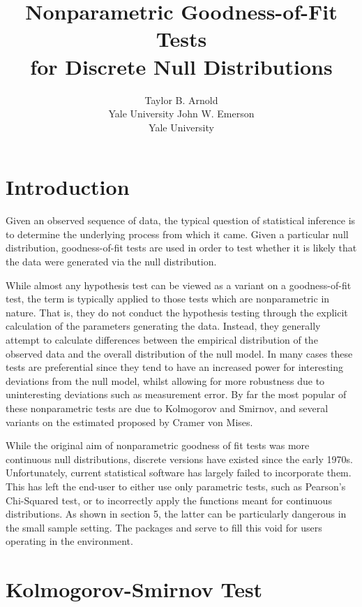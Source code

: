 \documentclass[article]{jss}
\author{Taylor B. Arnold \\ Yale University \And 
        John W. Emerson\\ Yale University}
\title{Nonparametric Goodness-of-Fit Tests \\ for Discrete Null Distributions}
\begin{document}

\section{Introduction}

Given an observed sequence of data, the typical question of statistical inference is to determine
the underlying process from which it came. Given a particular null distribution, goodness-of-fit tests 
are used in order to test whether it is likely that the data were generated via the null distribution.

While almost any hypothesis test can be viewed as a variant on a goodness-of-fit test, the term is typically
applied to those tests which are nonparametric in nature. That is, they do not conduct the hypothesis testing 
through the explicit calculation of the parameters generating the data. Instead, they generally attempt to 
calculate differences between the empirical distribution of the observed data and the overall distribution 
of the null model. In many cases these tests are preferential since they tend to have an increased power for 
interesting deviations from the null model, whilst allowing for more robustness due to uninteresting deviations
such as measurement error. By far the most popular of these nonparametric tests are due to Kolmogorov and Smirnov,
and several variants on the estimated proposed by Cramer von Mises. 

While the original aim of nonparametric goodness of fit tests was more continuous null distributions, discrete versions
have existed since the early 1970s. Unfortunately, current statistical software has largely failed to incorporate them.
This has left the end-user to either use only parametric tests, such as Pearson's Chi-Squared test, or to incorrectly
apply the functions meant for continuous distributions. As shown in section 5, the latter can be particularly dangerous
in the small sample setting. The packages  and  serve to fill this void for users
operating in the  environment. 

\section{Kolmogorov-Smirnov Test}
\end{document}
